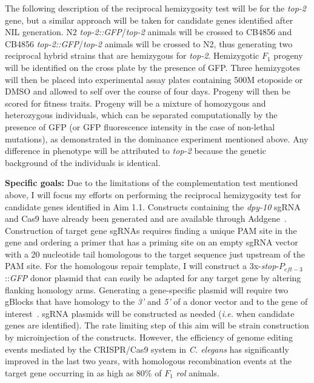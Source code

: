 \documentclass[12pt]{article}
\begin{document}
The following description of the reciprocal hemizygosity test will be for the {\it top-2} gene, but a similar approach will be taken for candidate genes identified after NIL generation. N2 {\it\textDelta top-2::GFP}/{\it top-2} animals will be crossed to CB4856 and CB4856 {\it\textDelta top-2::GFP}/{\it top-2} animals will be crossed to N2, thus generating two reciprocal hybrid strains that are hemizygous for {\it top-2}. Hemizygotic $F_{1}$ progeny will be identified on the cross plate by the presence of GFP. Three hemizygotes will then be placed into experimental assay plates containing 500\textmu M etoposide or DMSO and allowed to self over the course of four days. Progeny will then be scored for fitness traits. Progeny will be a mixture of homozygous and heterozygous individuals, which can be separated computationally by the presence of GFP (or GFP fluorescence intensity in the case of non-lethal mutations), as demonstrated in the dominance experiment mentioned above. Any difference in phenotype will be attributed to {\it top-2} because the genetic background of the individuals is identical. 

\vspace{5pt}

{\bf Specific goals: }Due to the limitations of the complementation test mentioned above, I will focus my efforts on performing the reciprocal hemizygosity test for candidate genes identified in Aim 1.1. Constructs containing the {\it dpy-10} sgRNA and Cas9 have already been generated and are available through Addgene~\cite{Arribere:2014ku}. Construction of target gene sgRNAs requires finding a unique PAM site in the gene and ordering a primer that has a priming site on an empty sgRNA vector with a 20 nucleotide tail homologous to the target sequence just upstream of the PAM site. For the homologous repair template, I will construct a 3x-{\it stop}-$P_{eft-3}$::{\it GFP} donor plasmid that can easily be adapted for any target gene by altering flanking homology arms. Generating a gene-specific plasmid will require two gBlocks that have homology to the {\it 3'} and {\it 5'} of a donor vector and to the gene of interest~\cite{Gibson:2009bc}. sgRNA plasmids will be constructed as needed ({\it i.e.} when candidate genes are identified). The rate limiting step of this aim will be strain construction by microinjection of the constructs. However, the efficiency of genome editing events mediated by the CRISPR/Cas9 system in {\it C. elegans} has significantly improved in the last two years, with homologous recombination events at the target gene occurring in as high as 80\% of $F_{1}$ {\it rol} animals. 
\end{document}
